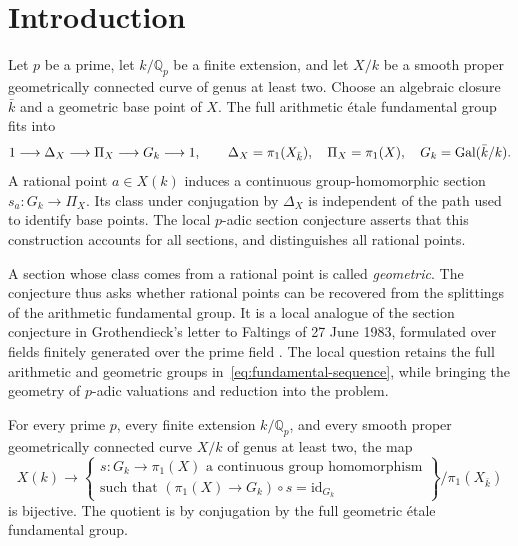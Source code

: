 \section{Introduction}\label{sec:introduction}

Let $p$ be a prime, let $k/\mathbb Q_p$ be a finite extension, and let
$X/k$ be a smooth proper geometrically connected curve of genus at least
two. Choose an algebraic closure $\bar k$ and a geometric base point
of $X$. The full arithmetic \'etale fundamental group fits into
\begin{equation}\label{eq:fundamental-sequence}
 1\longrightarrow\Delta_X\longrightarrow\Pi_X
   \longrightarrow G_k\longrightarrow1,
 \qquad
 \Delta_X=\pi_1(X_{\bar k}),\quad \Pi_X=\pi_1(X),\quad
 G_k=\operatorname{Gal}(\bar k/k).
\end{equation}
A rational point $a\in X(k)$ induces a continuous group-homomorphic
section $s_a:G_k\to\Pi_X$. Its class under conjugation by $\Delta_X$
is independent of the path used to identify base points. The local
$p$-adic section conjecture asserts that this construction accounts for
all sections, and distinguishes all rational points.

A section whose class comes from a rational point is called
\emph{geometric}. The conjecture thus asks whether rational points can
be recovered from the splittings of the arithmetic fundamental group.
It is a local analogue of the section conjecture in Grothendieck's
letter to Faltings of 27 June 1983, formulated over fields finitely
generated over the prime field
\cite[equation~(7) and the subsequent properness correction]{GrothendieckLetter}.
The local question retains the full arithmetic and geometric groups
in~\eqref{eq:fundamental-sequence}, while bringing the geometry of
$p$-adic valuations and reduction into the problem.

\begin{theorem}\label{thm:section}
For every prime $p$, every finite extension $k/\mathbb Q_p$, and every
smooth proper geometrically connected curve $X/k$ of genus at least two,
the map
\[
 X(k)\longrightarrow
 \left\{\begin{gathered}
 s:G_k\to\pi_1(X)\text{ a continuous group homomorphism}\\
 \text{such that }(\pi_1(X)\to G_k)\circ s=\mathrm{id}_{G_k}
 \end{gathered}\right\}\big/\pi_1(X_{\bar k})
\]
is bijective. The quotient is by conjugation by the full geometric
\'etale fundamental group.
\end{theorem}

